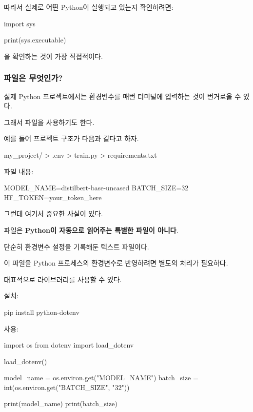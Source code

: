 따라서 실제로 어떤 Python이 실행되고 있는지 확인하려면:

\begin{dhkcode}
import sys

print(sys.executable)
\end{dhkcode}

을 확인하는 것이 가장 직접적이다.

\subsubsection{파일은 무엇인가?}

실제 Python 프로젝트에서는 환경변수를 매번 터미널에 입력하는 것이 번거로울 수 있다.

그래서 파일을 사용하기도 한다.

예를 들어 프로젝트 구조가 다음과 같다고 하자.

\begin{dhkdir}
my_project/
> .env
> train.py
> requirements.txt
\end{dhkdir}

파일 내용:

\begin{dhkcode}
MODEL_NAME=distilbert-base-uncased
BATCH_SIZE=32
HF_TOKEN=your_token_here
\end{dhkcode}

그런데 여기서 중요한 사실이 있다.

파일은 \textbf{Python이 자동으로 읽어주는 특별한 파일이 아니다}.

단순히 환경변수 설정을 기록해둔 텍스트 파일이다.

이 파일을 Python 프로세스의 환경변수로 반영하려면 별도의 처리가 필요하다.

대표적으로  라이브러리를 사용할 수 있다.

설치:

\begin{dhkzsh}
pip install python-dotenv
\end{dhkzsh}

사용:

\begin{dhkcode}
import os
from dotenv import load_dotenv

load_dotenv()

model_name = os.environ.get("MODEL_NAME")
batch_size = int(os.environ.get("BATCH_SIZE", "32"))

print(model_name)
print(batch_size)
\end{dhkcode}

